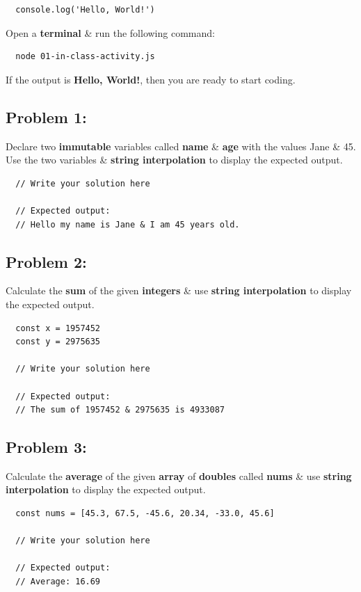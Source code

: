 \documentclass{article}
\begin{document}
\begin{verbatim}
  console.log('Hello, World!')
\end{verbatim}

Open a \textbf{terminal} \& run the following command:

\begin{verbatim}
  node 01-in-class-activity.js
\end{verbatim}

If the output is \textbf{Hello, World!}, then you are ready to start coding.

\subsection*{Problem 1:} 
Declare two \textbf{immutable} variables called \textbf{name} \& \textbf{age} with the values Jane \& 45. Use the two variables \& \textbf{string interpolation} to display the expected output. 

\begin{verbatim}
  // Write your solution here

  // Expected output:
  // Hello my name is Jane & I am 45 years old.
\end{verbatim}

\subsection*{Problem 2:} 
Calculate the \textbf{sum} of the given \textbf{integers} \& use \textbf{string interpolation} to display the expected output.

\begin{verbatim}
  const x = 1957452
  const y = 2975635

  // Write your solution here

  // Expected output:
  // The sum of 1957452 & 2975635 is 4933087
\end{verbatim}

\subsection*{Problem 3:} 
Calculate the \textbf{average} of the given \textbf{array} of \textbf{doubles} called \textbf{nums} \& use \textbf{string interpolation} to display the expected output.

\begin{verbatim}
  const nums = [45.3, 67.5, -45.6, 20.34, -33.0, 45.6]

  // Write your solution here

  // Expected output:
  // Average: 16.69 
\end{verbatim}
\end{document}
